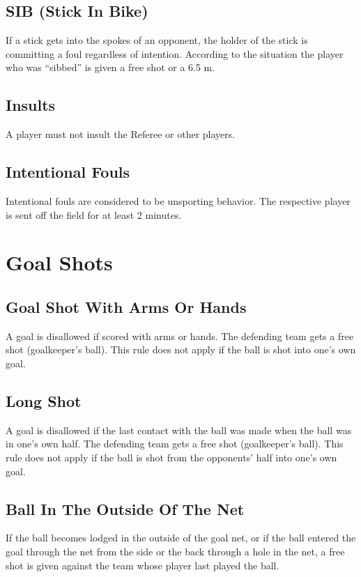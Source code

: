 \subsection{SIB (Stick In Bike)}
If a stick gets into the spokes of an opponent, the holder of the stick is committing a foul regardless of intention.
According to the situation the player who was “sibbed” is given a free shot or a 6.5 m.

\subsection{Insults}
A player must not insult the Referee or other players.

\subsection{Intentional Fouls}
Intentional fouls are considered to be unsporting behavior. The respective player is sent off the field for at least 2
minutes.

\section{Goal Shots}

\subsection{Goal Shot With Arms Or Hands}
A goal is disallowed if scored with arms or hands. The defending team gets a free shot (goalkeeper's ball). This rule
does not apply if the ball is shot into one's own goal.

\subsection{Long Shot}
A goal is disallowed if the last contact with the ball was made when the ball was in one’s own half. The defending
team gets a free shot (goalkeeper's ball). This rule does not apply if the ball is shot from the opponents' half into one's
own goal.

\subsection{Ball In The Outside Of The Net}
If the ball becomes lodged in the outside of the goal net, or if the ball entered the goal through the net from the side or
the back through a hole in the net, a free shot is given against the team whose player last played the ball.

